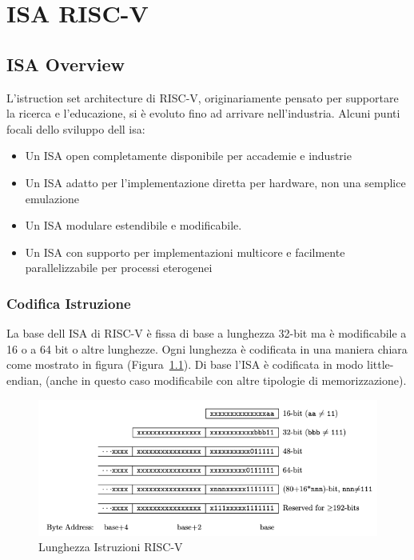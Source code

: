 \documentclass[12pt,a4paper]{report}
\begin{document}
\chapter{ISA RISC-V}

\section{ISA Overview}

L’istruction set architecture di RISC-V, originariamente pensato per supportare la ricerca e l’educazione, si è evoluto fino ad arrivare nell'industria. Alcuni punti focali dello sviluppo dell isa:
\begin{itemize}
	\item Un ISA open completamente disponibile per accademie e industrie
	\item Un ISA adatto per l'implementazione diretta per hardware, non una semplice emulazione
	\item Un ISA modulare estendibile e modificabile.
	\item Un ISA con supporto per implementazioni multicore e facilmente parallelizzabile per processi eterogenei
\end{itemize}


\subsection{Codifica Istruzione}
La base dell ISA di RISC-V è fissa di base a lunghezza 32-bit ma è modificabile a 16 o a 64 bit o altre lunghezze.  Ogni lunghezza  è codificata in una maniera chiara come mostrato in figura (Figura~\ref{Fig:lunghezza_Istruzioni}). Di base l’ISA è codificata in modo little-endian, (anche in questo caso  modificabile con altre tipologie di memorizzazione). 

\begin{figure}
	\centering
		\includegraphics[width = \textwidth]{DiverseLunghezze.png}
		\caption{Lunghezza Istruzioni RISC-V}
		 \label{Fig:lunghezza_Istruzioni} 
\end{figure}
\end{document}
